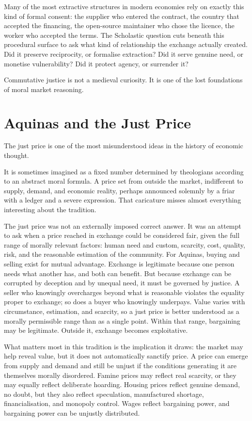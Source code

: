 \documentclass[11pt,a4paper,oneside]{book}
\begin{document}
Many of the most extractive structures in modern economies rely on exactly this kind of formal consent: the supplier who entered the contract, the country that accepted the financing, the open-source maintainer who chose the licence, the worker who accepted the terms. The Scholastic question cuts beneath this procedural surface to ask what kind of relationship the exchange actually created. Did it preserve reciprocity, or formalise extraction? Did it serve genuine need, or monetise vulnerability? Did it protect agency, or surrender it?

Commutative justice is not a medieval curiosity. It is one of the lost foundations of moral market reasoning.

\section*{Aquinas and the Just Price}

The just price is one of the most misunderstood ideas in the history of economic thought.

It is sometimes imagined as a fixed number determined by theologians according to an abstract moral formula. A price set from outside the market, indifferent to supply, demand, and economic reality, perhaps announced solemnly by a friar with a ledger and a severe expression. That caricature misses almost everything interesting about the tradition.

The just price was not an externally imposed correct answer. It was an attempt to ask when a price reached in exchange could be considered fair, given the full range of morally relevant factors: human need and custom, scarcity, cost, quality, risk, and the reasonable estimation of the community. For Aquinas, buying and selling exist for mutual advantage. Exchange is legitimate because one person needs what another has, and both can benefit. But because exchange can be corrupted by deception and by unequal need, it must be governed by justice. A seller who knowingly overcharges beyond what is reasonable violates the equality proper to exchange; so does a buyer who knowingly underpays. Value varies with circumstance, estimation, and scarcity, so a just price is better understood as a morally permissible range than as a single point. Within that range, bargaining may be legitimate. Outside it, exchange becomes exploitative.

What matters most in this tradition is the implication it draws: the market may help reveal value, but it does not automatically sanctify price. A price can emerge from supply and demand and still be unjust if the conditions generating it are themselves morally disordered. Famine prices may reflect real scarcity, or they may equally reflect deliberate hoarding. Housing prices reflect genuine demand, no doubt, but they also reflect speculation, manufactured shortage, financialisation, and monopoly control. Wages reflect bargaining power, and bargaining power can be unjustly distributed.
\end{document}

